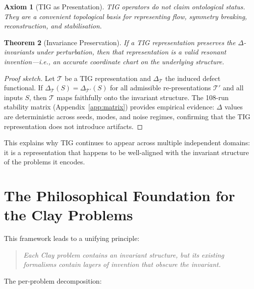 \documentclass[12pt, openany]{book}
\newtheorem{theorem}{Theorem}[chapter]
\newtheorem{axiom}[theorem]{Axiom}
\theoremstyle{remark}
\begin{document}
\begin{axiom}[TIG as Presentation]\label{ax:tig-pres}
TIG operators do not claim ontological status. They are a convenient topological basis
for representing flow, symmetry breaking, reconstruction, and stabilisation.
\end{axiom}

\begin{theorem}[Invariance Preservation]\label{thm:inv-pres}
If a TIG representation preserves the $\Delta$-invariants under perturbation, then
that representation is a \emph{valid resonant invention}---i.e., an accurate coordinate
chart on the underlying structure.
\end{theorem}

\begin{proof}[Proof sketch]
Let $\mathcal{T}$ be a TIG representation and $\Delta_{\mathcal{T}}$ the induced defect
functional. If $\Delta_{\mathcal{T}}(S) = \Delta_{\mathcal{T}'}(S)$ for all admissible
re-presentations $\mathcal{T}'$ and all inputs $S$, then $\mathcal{T}$ maps faithfully
onto the invariant structure. The 108-run stability matrix (Appendix~\ref{app:matrix})
provides empirical evidence: $\Delta$ values are deterministic across seeds, modes,
and noise regimes, confirming that the TIG representation does not introduce artifacts.
\end{proof}

\noindent
This explains why TIG continues to appear across multiple independent domains: it is
a representation that happens to be well-aligned with the invariant structure of the
problems it encodes.

\section{The Philosophical Foundation for the Clay Problems}
\label{sec:found-clay}

This framework leads to a unifying principle:

\begin{quote}
\emph{Each Clay problem contains an invariant structure, but its existing formalisms
contain layers of invention that obscure the invariant.}
\end{quote}

\noindent
The per-problem decomposition:
\end{document}
